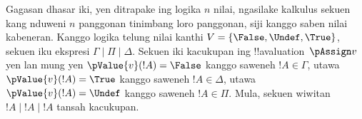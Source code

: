 \documentclass[../../../include/open-logic-section]{subfiles}
\begin{document}
Gagasan dhasar iki, yen ditrapake ing logika $n$ nilai,
ngasilake kalkulus sekuen kang nduweni $n$ panggonan tinimbang
loro panggonan, siji kanggo saben nilai kabeneran. Kanggo logika
telung nilai kanthi $V = \{\False, \Undef, \True\}$, sekuen
iku ekspresi $\Gamma \mid \Pi \mid \Delta$. Sekuen iki kacukupan
ing !!a{valuation}~$\pAssign v$ yen lan mung yen
$\pValue{v}(!A) = \False$ kanggo saweneh $!A \in \Gamma$,
utawa $\pValue{v}(!A) = \True$ kanggo saweneh
$!A \in \Delta$, utawa $\pValue{v}(!A) = \Undef$ kanggo
saweneh $!A \in \Pi$. Mula, sekuen wiwitan
$!A \mid !A \mid !A$ tansah kacukupan.
\end{document}
